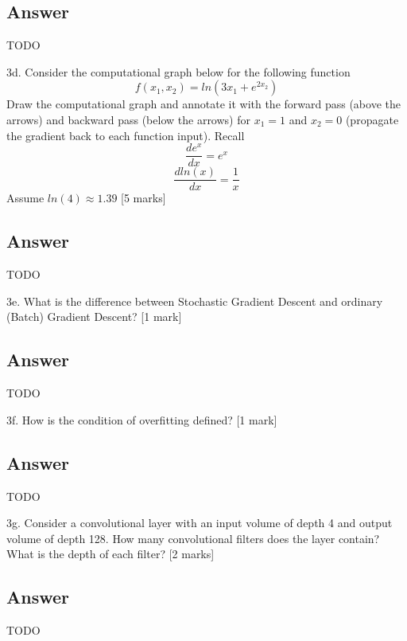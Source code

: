 \documentclass[
	12pt, %
]{fphw}
\begin{document}
\subsection*{Answer}
TODO
\begin{problem}
3d. Consider the computational graph below for the following function
\begin{equation}
	f(x_1, x_2) = ln(3x_1+e^{2x_2})
\end{equation}
Draw the computational graph and annotate it with the forward pass (above the arrows)
and backward pass (below the arrows) for $x_1=1$ and $x_2=0$ (propagate the gradient
back to each function input). Recall
\begin{equation}
	\frac{de^x}{dx} = e^x
\end{equation}
\begin{equation}
	\frac{dln(x)}{dx} = \frac{1}{x}
\end{equation}
Assume $ln(4) \approx 1.39$ [5 marks]
\end{problem}
\subsection*{Answer}
TODO
\begin{problem}
3e. What is the difference between Stochastic Gradient Descent and ordinary (Batch)
Gradient Descent? [1 mark]
\end{problem}
\subsection*{Answer}
TODO
\begin{problem}
3f. How is the condition of overfitting defined? [1 mark]
\end{problem}
\subsection*{Answer}
TODO
\begin{problem}
3g. Consider a convolutional layer with an input volume of depth 4 and output volume of
depth 128. How many convolutional filters does the layer contain? What is the depth of
each filter? [2 marks]
\end{problem}
\subsection*{Answer}
TODO
\end{document}
